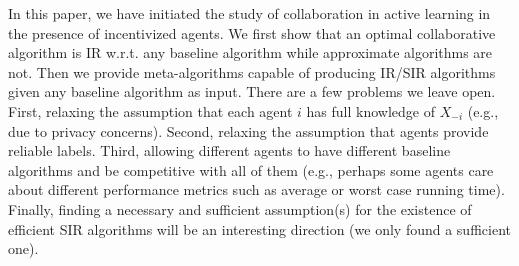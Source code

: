 In this paper, we have initiated the study of collaboration in active learning in the presence of incentivized agents. We first show that an optimal collaborative algorithm is IR w.r.t. any baseline algorithm while approximate algorithms are not.
Then we provide meta-algorithms capable of producing IR/SIR algorithms given any baseline algorithm as input.
There are a few problems we leave open. First, relaxing the assumption that each agent $i$ has full knowledge of $X_{-i}$ (e.g., due to privacy concerns). Second, relaxing the assumption that agents provide reliable labels. 
Third, allowing different agents to have different baseline algorithms and be competitive with all of them (e.g., perhaps some agents care about different performance metrics such as average or worst case running time). Finally, finding a necessary and sufficient assumption(s) for the existence of efficient SIR algorithms will be an interesting direction (we only found a sufficient one).
